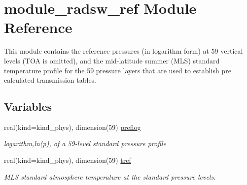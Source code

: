 \hypertarget{namespacemodule__radsw__ref}{}\section{module\+\_\+radsw\+\_\+ref Module Reference}
\label{namespacemodule__radsw__ref}


This module contains the reference pressures (in logarithm form) at 59 vertical levels (T\+OA is omitted), and the mid-\/latitude summer (M\+LS) standard temperature profile for the 59 pressure layers that are used to establish pre calculated transmission tables.  


\subsection*{Variables}
\begin{DoxyCompactItemize}
\item 
\mbox{\label{namespacemodule__radsw__ref_afb71559d084ca709bd134e6c489035e2}} 
real(kind=kind\+\_\+phys), dimension(59) \hyperlink{namespacemodule__radsw__ref_afb71559d084ca709bd134e6c489035e2}{preflog}
\begin{DoxyCompactList}\small\item\em logarithm,ln(p), of a 59-\/level standard pressure profile \end{DoxyCompactList}\item 
\mbox{\label{namespacemodule__radsw__ref_a449fffa7047caa0fba6c166c26f7dbbd}} 
real(kind=kind\+\_\+phys), dimension(59) \hyperlink{namespacemodule__radsw__ref_a449fffa7047caa0fba6c166c26f7dbbd}{tref}
\begin{DoxyCompactList}\small\item\em M\+LS standard atmosphere temperature at the standard pressure levels. \end{DoxyCompactList}\end{DoxyCompactItemize}
